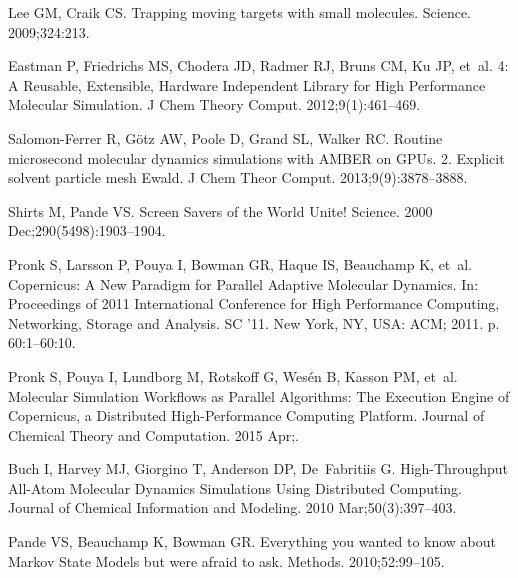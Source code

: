 \documentclass[10pt,letterpaper]{article}
\begin{document}
% 

\begin{thebibliography}{100}

Lee GM, Craik CS.
\newblock Trapping moving targets with small molecules.
\newblock Science. 2009;324:213.

Eastman P, Friedrichs MS, Chodera JD, Radmer RJ, Bruns CM, Ku JP, et~al.
 4: A Reusable, Extensible, Hardware Independent Library for
  High Performance Molecular Simulation.
\newblock J Chem Theory Comput. 2012;9(1):461--469.

Salomon-Ferrer R, G\"{o}tz AW, Poole D, Grand SL, Walker RC.
\newblock Routine microsecond molecular dynamics simulations with {AMBER} on
  {GPUs}. 2. Explicit solvent particle mesh {Ewald}.
\newblock J Chem Theor Comput. 2013;9(9):3878--3888.

Shirts M, Pande VS.
\newblock Screen {Savers} of the {World} {Unite}!
\newblock Science. 2000 Dec;290(5498):1903--1904.

Pronk S, Larsson P, Pouya I, Bowman GR, Haque IS, Beauchamp K, et~al.
\newblock Copernicus: {A} {New} {Paradigm} for {Parallel} {Adaptive}
  {Molecular} {Dynamics}.
\newblock In: Proceedings of 2011 {International} {Conference} for {High}
  {Performance} {Computing}, {Networking}, {Storage} and {Analysis}. {SC} '11.
  New York, NY, USA: ACM; 2011. p. 60:1--60:10.

Pronk S, Pouya I, Lundborg M, Rotskoff G, Wes\'{e}n B, Kasson PM, et~al.
\newblock Molecular {Simulation} {Workflows} as {Parallel} {Algorithms}: {The}
  {Execution} {Engine} of {Copernicus}, a {Distributed} {High}-{Performance}
  {Computing} {Platform}.
\newblock Journal of Chemical Theory and Computation. 2015 Apr;.

Buch I, Harvey MJ, Giorgino T, Anderson DP, De~Fabritiis G.
\newblock High-{Throughput} {All}-{Atom} {Molecular} {Dynamics} {Simulations}
  {Using} {Distributed} {Computing}.
\newblock Journal of Chemical Information and Modeling. 2010
  Mar;50(3):397--403.

Pande VS, Beauchamp K, Bowman GR.
\newblock Everything you wanted to know about {Markov State Models} but were
  afraid to ask.
\newblock Methods. 2010;52:99--105.


\end{thebibliography}
\end{document}
